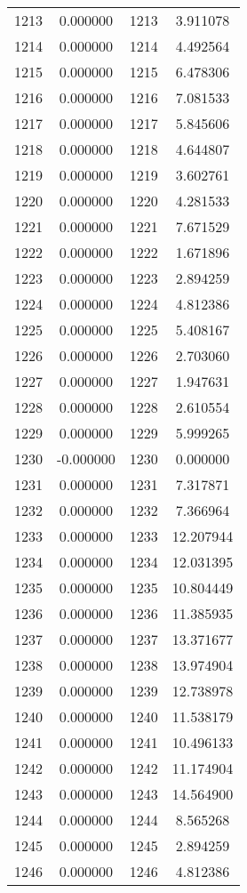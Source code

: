 \documentclass[12pt]{article}
\begin{document}
\begin{longtable}{@{}cccc@{}}
1213 & 0.000000 & 1213 & 3.911078 \\
1214 & 0.000000 & 1214 & 4.492564 \\
1215 & 0.000000 & 1215 & 6.478306 \\
1216 & 0.000000 & 1216 & 7.081533 \\
1217 & 0.000000 & 1217 & 5.845606 \\
1218 & 0.000000 & 1218 & 4.644807 \\
1219 & 0.000000 & 1219 & 3.602761 \\
1220 & 0.000000 & 1220 & 4.281533 \\
1221 & 0.000000 & 1221 & 7.671529 \\
1222 & 0.000000 & 1222 & 1.671896 \\
1223 & 0.000000 & 1223 & 2.894259 \\
1224 & 0.000000 & 1224 & 4.812386 \\
1225 & 0.000000 & 1225 & 5.408167 \\
1226 & 0.000000 & 1226 & 2.703060 \\
1227 & 0.000000 & 1227 & 1.947631 \\
1228 & 0.000000 & 1228 & 2.610554 \\
1229 & 0.000000 & 1229 & 5.999265 \\
1230 & -0.000000 & 1230 & 0.000000 \\
1231 & 0.000000 & 1231 & 7.317871 \\
1232 & 0.000000 & 1232 & 7.366964 \\
1233 & 0.000000 & 1233 & 12.207944 \\
1234 & 0.000000 & 1234 & 12.031395 \\
1235 & 0.000000 & 1235 & 10.804449 \\
1236 & 0.000000 & 1236 & 11.385935 \\
1237 & 0.000000 & 1237 & 13.371677 \\
1238 & 0.000000 & 1238 & 13.974904 \\
1239 & 0.000000 & 1239 & 12.738978 \\
1240 & 0.000000 & 1240 & 11.538179 \\
1241 & 0.000000 & 1241 & 10.496133 \\
1242 & 0.000000 & 1242 & 11.174904 \\
1243 & 0.000000 & 1243 & 14.564900 \\
1244 & 0.000000 & 1244 & 8.565268 \\
1245 & 0.000000 & 1245 & 2.894259 \\
1246 & 0.000000 & 1246 & 4.812386 \\

\end{longtable}
\end{document}
